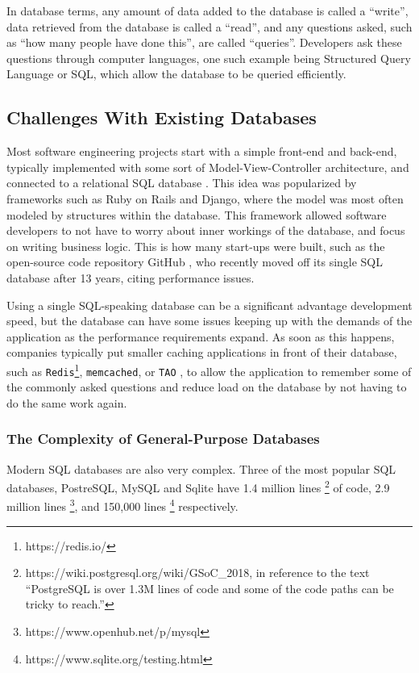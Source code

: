 \documentclass[10pt,twocolumn]{article}
\begin{document}
In database terms, any amount of data added to the database is called a
``write'', data retrieved from the database is called a ``read'', and any
questions asked, such as ``how many people have done this'', are called
``queries''. Developers ask these questions through computer languages, one such
example being Structured Query Language or SQL, which allow
the database to be queried efficiently.

\subsection{Challenges With Existing Databases}

Most software engineering projects start with a simple front-end and back-end,
typically implemented with some sort of Model-View-Controller architecture, and
connected to a relational SQL database \cite{sqliteOnlyDatabase}. This idea was
popularized by frameworks such as Ruby on Rails and Django, where the model was
most often modeled by structures within the database. This framework allowed
software developers to not have to worry about inner workings of the database,
and focus on writing business logic. This is how many start-ups were built, such
as the open-source code repository GitHub \cite{githubSingleSQL}, who recently
moved off its single SQL database after 13 years, citing performance issues.

Using a single SQL-speaking database can be a significant advantage development
speed, but the database can have some issues keeping up with the demands of the
application as the performance requirements expand.
As soon as this happens, companies typically put smaller caching applications in
front of their database, such as \verb|Redis|\footnote{https://redis.io/},
\verb|memcached|\cite{nishtala2013scaling}, or \verb|TAO| \cite{bronson2013tao},
to allow the application to remember some of the commonly asked questions and
reduce load on the database by not having to do the same work again.

\subsubsection{The Complexity of General-Purpose Databases}
Modern SQL databases are also very complex. Three of the most popular SQL
databases, PostreSQL, MySQL and Sqlite have 1.4 million lines
\footnote{https://wiki.postgresql.org/wiki/GSoC\_2018, in reference to the
text ``PostgreSQL is over 1.3M lines of code and some of the code paths can be
tricky to reach.''} of code, 2.9 million lines
\footnote{https://www.openhub.net/p/mysql}, and 150,000 lines
\footnote{https://www.sqlite.org/testing.html} respectively.
\end{document}
